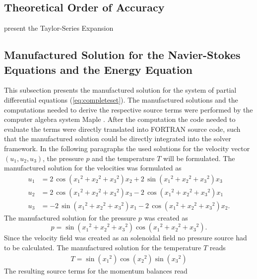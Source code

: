 \subsection{Theoretical Order of Accuracy}
      present the Taylor-Series Expansion

\subsection{Manufactured Solution for the Navier-Stokes Equations and the Energy Equation}
\label{sec:manufacturedsolution}

This subsection presents the manufactured solution for the system of partial differential equations (\ref{eq:completeset}). The manufactured solutions and the computations needed to derive the respective source terms were performed by the computer algebra system Maple \cite{maple}. After the computation the code needed to evaluate the terms were directly translated into FORTRAN source code, such that the manufactured solution could be directly integrated into the solver framework. In the following paragraphs the used solutions for the velocity vector \((u_1,u_2,u_3)\), the pressure \(p\) and the temperature \(T\) will be formulated. The manufactured solution for the velocities was formulated as
\begin{align*}
  u_1 &= 2\,\cos \left( {x_1}^{2}+{x_2}^{2}+{x_3}^{2} \right) x_2+2\,\sin \left( {x_1}^{2}+{x_2}^{2}+{x_3}^{2} \right) x_3 \\[1.0em]
  u_2 &= 2\,\cos \left( {x_1}^{2}+{x_2}^{2}+{x_3}^{2} \right) x_3-2\,\cos \left( {x_1}^{2 }+{x_2}^{2}+{x_3}^{2} \right) x_1 \\[1.0em]
  u_3 &= -2\,\sin \left( {x_1}^{2}+{x_2}^{2}+{x_3}^{2} \right) x_1-2\,\cos \left( {x_1}^{ 2}+{x_2}^{2}+{x_3}^{2} \right) x_2.
\end{align*}
The manufactured solution for the pressure \(p\) was created as
\begin{displaymath}
  p = \sin \left( {x_1}^{2}+{x_2}^{2}+{x_3}^{2} \right) \cos \left( {x_1}^{2}+ {x_2}^{2 }+{x_3}^{2} \right).
\end{displaymath}
Since the velocity field was created as an solenoidal field no pressure source had to be calculated. The manufactured solution for the temperature \(T\) reads
\begin{align*}
  T=\sin \left( {x_1}^{2} \right) \cos \left( {x_2}^{2} \right) \sin \left( {x_3 }^{2} \right)
\end{align*}
The resulting source terms for the momentum balances read
